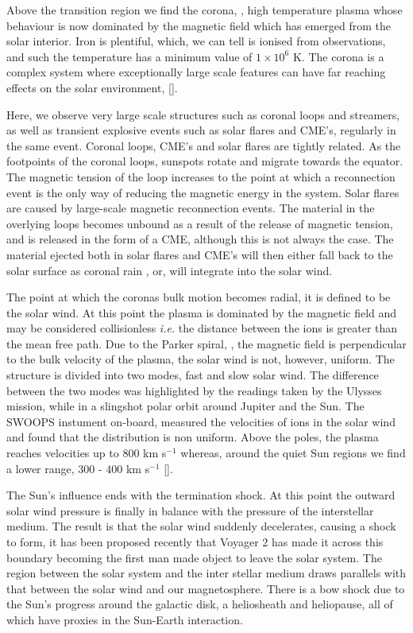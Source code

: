 Above the transition region we find the corona, \cite{Golub2009}, high temperature plasma whose behaviour is now dominated by the magnetic field which has emerged from the solar interior.
Iron is plentiful, which, we can tell is ionised from observations, and such the temperature has a minimum value of $1 \times 10^6$ K.
The corona is a complex system where exceptionally large scale features can have far reaching effects on the solar environment, [\cite{Reale2014}].

Here, we observe very large scale structures such as coronal loops and streamers, as well as transient explosive events such as solar flares and CME's, regularly in the same event.
Coronal loops, CME's and solar flares are tightly related.
As the footpoints of the coronal loops, sunspots rotate and migrate towards the equator. 
The magnetic tension of the loop increases to the point at which a reconnection event is the only way of reducing the magnetic energy in the system.
Solar flares are caused by large-scale magnetic reconnection events.
The material in the overlying loops becomes unbound as a result of the release of magnetic tension, and is released in the form of a CME, although this is not always the case.
The material ejected both in solar flares and CME's will then either fall back to the solar surface as coronal rain , or, will integrate into the solar wind.

The point at which the coronas bulk motion becomes radial, it is defined to be the solar wind.
At this point the plasma is dominated by the magnetic field and may be considered collisionless \emph{i.e.} the distance between the ions is greater than the mean free path.
Due to the Parker spiral, \cite{Forsyth2013}, the magnetic field is perpendicular to the bulk velocity of the plasma, the solar wind is not, however, uniform.
The structure is divided into two modes, fast and slow solar wind. 
The difference between the two modes was highlighted by the readings taken by the Ulysses mission, while in a slingshot polar orbit around Jupiter and the Sun.
The SWOOPS instument on-board, measured the velocities of ions in the solar wind and found that the distribution is non uniform.
Above the poles, the plasma reaches velocities up to $800$ km s${^{-1}}$ whereas, around the quiet Sun regions we find a lower range, $300$ - $400$ km s${^{-1}}$ [\cite{McComas2003}].

The Sun's influence ends with the termination shock.
At this point the outward solar wind pressure is finally in balance with the pressure of the interstellar medium.
The result is that the solar wind suddenly decelerates, causing a shock to form, it has been proposed recently that Voyager 2 has made it across this boundary becoming the first man made object to leave the solar system.
The region between the solar system and the inter stellar medium draws parallels with that between the solar wind and our magnetosphere.
There is a bow shock due to the Sun's progress around the galactic disk, a heliosheath and heliopause, all of which have proxies in the Sun-Earth interaction.

